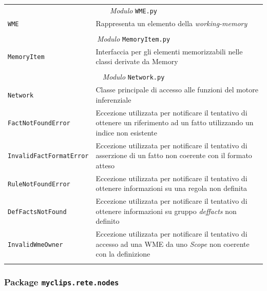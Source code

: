 \begin{longtable}{p{5.5cm}p{6.5cm}}
\multicolumn{2}{c}{\emph{Modulo} \texttt{WME.py}}\\
	\hdashline[5pt/5pt]
		\texttt{WME} & Rappresenta un elemento della \emph{working-memory}\\ 
	\hline\\

\multicolumn{2}{c}{\emph{Modulo} \texttt{MemoryItem.py}}\\
	\hdashline[5pt/5pt]
		\texttt{MemoryItem} & Interfaccia per gli elementi memorizzabili nelle classi derivate da Memory \\ 
	\hline\\

\multicolumn{2}{c}{\emph{Modulo} \texttt{Network.py}}\\
	\hdashline[5pt/5pt]
		\texttt{Network} & Classe principale di accesso alle funzioni del motore inferenziale\\ 
	\hdashline[1pt/5pt]
		\texttt{FactNotFoundError} & Eccezione utilizzata per notificare il tentativo di ottenere un riferimento ad un fatto utilizzando un indice non esistente\\ 
	\hdashline[1pt/5pt]
		\texttt{InvalidFactFormatError} & Eccezione utilizzata per notificare il tentativo di asserzione di un fatto non coerente con il formato atteso\\ 
	\hdashline[1pt/5pt]
		\texttt{RuleNotFoundError} & Eccezione utilizzata per notificare il tentativo di ottenere informazioni su una regola non definita\\ 
	\hdashline[1pt/5pt]
		\texttt{DefFactsNotFound} & Eccezione utilizzata per notificare il tentativo di ottenere informazioni su gruppo \emph{deffacts} non definito\\ 
	\hdashline[1pt/5pt]
		\texttt{InvalidWmeOwner} & Eccezione utilizzata per notificare il tentativo di accesso ad una WME da uno \emph{Scope} non coerente con la definizione\\ 

	\hline\\

\end{longtable}


\subsubsection{Package \texttt{myclips.rete.nodes}}

